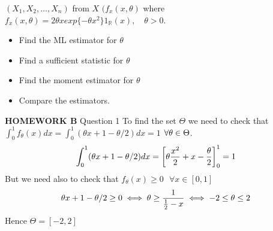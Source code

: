 \begin{ex}
	$(X_1,X_2,\ldots,X_n)$ from $X$ $(f_x(x,\theta)$ where $f_x(x,\theta)=2\theta x exp\{ -\theta x^2\} 1_{\mathbb{R}}(x), \quad \theta > 0$.
	\begin{itemize}
		\item
		Find the ML estimator for $\theta$
		\item
		Find a sufficient statistic for $\theta$
		\item
		Find the moment estimator for $\theta$
		\item
		Compare the estimators.
	\end{itemize}
\end{ex}
\clearpage
\textbf{HOMEWORK B}
Question 1
To find the set $\Theta$ we need to check that $\int_{0}^{1} f_\theta (x) dx=\int_{0}^{1} (\theta x +1 - \theta/2)dx=1$  $\forall \theta \in \Theta$.
$$\int_{0}^{1} (\theta x +1 - \theta/2)dx=\bigg[ \theta \frac{x^2}{2} + x - \frac{\theta}{2} \bigg]_0^1=1$$
But we need also to check that $f_\theta (x)\geq 0 \ \ \ \forall x\in [0,1]$
$$\theta x +1 - \theta/2 \geq 0 \iff \theta \geq \frac{1}{\frac{1}{2}-x}\iff -2\leq \theta \leq 2$$
Hence $\Theta=[-2,2]$
